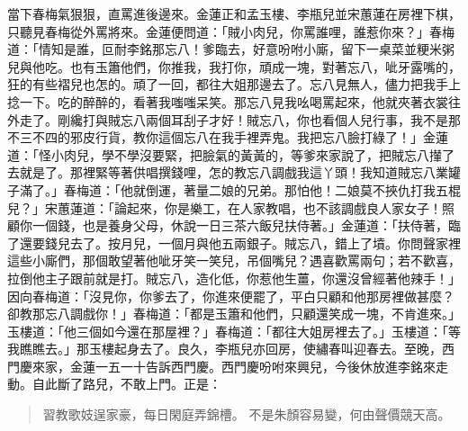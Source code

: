 當下春梅氣狠狠，直罵進後邊來。金蓮正和孟玉樓、李瓶兒並宋蕙蓮在房裡下棋，只聽見春梅從外罵將來。金蓮便問道：「賊小肉兒，你罵誰哩，誰惹你來？」春梅道：「情知是誰，叵耐李銘那忘八！爹臨去，好意吩咐小廝，留下一桌菜並粳米粥兒與他吃。也有玉簫他們，你推我，我打你，頑成一塊，對著忘八，呲牙露嘴的，狂的有些褶兒也怎的。頑了一回，都往大姐那邊去了。忘八見無人，儘力把我手上捻一下。吃的醉醉的，看著我嗤嗤呆笑。那忘八見我吆喝罵起來，他就夾著衣裳往外走了。剛纔打與賊忘八兩個耳刮子才好！賊忘八，你也看個人兒行事，我不是那不三不四的邪皮行貨，教你這個忘八在我手裡弄鬼。我把忘八臉打綠了！」金蓮道：「怪小肉兒，學不學沒要緊，把臉氣的黃黃的，等爹來家說了，把賊忘八攆了去就是了。那裡緊等著供唱撰錢哩，怎的教忘八調戲我這丫頭！我知道賊忘八業罐子滿了。」春梅道：「他就倒運，著量二娘的兄弟。那怕他！二娘莫不挾仇打我五棍兒？」宋蕙蓮道：「論起來，你是樂工，在人家教唱，也不該調戲良人家女子！照顧你一個錢，也是養身父母，休說一日三茶六飯兒扶侍著。」金蓮道：「扶侍著，臨了還要錢兒去了。按月兒，一個月與他五兩銀子。賊忘八，錯上了墳。你問聲家裡這些小廝們，那個敢望著他呲牙笑一笑兒，吊個嘴兒？遇喜歡罵兩句；若不歡喜，拉倒他主子跟前就是打。賊忘八，造化低，你惹他生薑，你還沒曾經著他辣手！」因向春梅道：「沒見你，你爹去了，你進來便罷了，平白只顧和他那房裡做甚麼？卻教那忘八調戲你！」春梅道：「都是玉簫和他們，只顧還笑成一塊，不肯進來。」玉樓道：「他三個如今還在那屋裡？」春梅道：「都往大姐房裡去了。」玉樓道：「等我瞧瞧去。」那玉樓起身去了。良久，李瓶兒亦回房，使繡春叫迎春去。至晚，西門慶來家，金蓮一五一十告訴西門慶。西門慶吩咐來興兒，今後休放進李銘來走動。自此斷了路兒，不敢上門。正是：
\begin{quote}
習教歌妓逞家豪，每日閑庭弄錦槽。
不是朱顏容易變，何由聲價競天高。
\end{quote}
